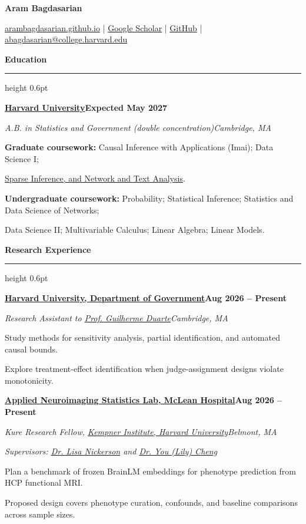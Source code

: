 \documentclass[11pt]{article}
\newcommand{\cvsection}[2][6\baselineskip]{%
  \Needspace{#1}%
  \vspace{5pt}%
  {\large\bfseries #2}\par
  \vspace{1pt}\hrule height 0.6pt \vspace{3pt}}
\newcommand{\cventry}[5][5\baselineskip]{%
  \Needspace{#1}%
  \vspace{2pt}%
  {\textbf{#2}\hfill\textbf{#3}\par}%
  {\textit{#4}\hfill\textit{#5}\par}%
}
\newcommand{\lnDuarte}{https://duarteguilherme.github.io/}
\newcommand{\lnKempner}{https://kempnerinstitute.harvard.edu/}
\newcommand{\lnNickerson}{https://mbb.harvard.edu/people/lisa-nickerson}
\newcommand{\lnGitHub}{https://github.com/arambagdasarian}
\newcommand{\lnSite}{https://arambagdasarian.github.io/}
\newcommand{\lnScholar}{https://scholar.google.com/citations?user=Gbhs4TcAAAAJ}
\newcommand{\lnCheng}{https://lilianyou.github.io/}
\newcommand{\lnANSR}{https://ansr-laboratory.github.io/opportunity/student-ra/}
\newcommand{\lnSparse}{https://my.harvard.edu/course/STAT236/2026-Fall/}
\newcommand{\lnHarvard}{https://www.harvard.edu/}
\newcommand{\lnGovernment}{https://www.gov.harvard.edu/}
\begin{document}
\thispagestyle{empty}
\raggedright

{\centering
  {\huge\bfseries Aram Bagdasarian}\par
  \vspace{3pt}
  {\href{\lnSite}{arambagdasarian.github.io} \quad|\quad
   \href{\lnScholar}{Google Scholar} \quad|\quad
   \href{\lnGitHub}{GitHub} \quad|\quad
   \href{mailto:abagdasarian@college.harvard.edu}{abagdasarian@college.harvard.edu}}\par
}
\cvsection{Education}
\cventry{\href{\lnHarvard}{Harvard University}}{Expected May 2027}
        {A.B. in Statistics and Government (double concentration)}{Cambridge, MA}
{\small\textbf{Graduate coursework:} Causal Inference with Applications (Imai); Data Science I;\par
\href{\lnSparse}{Sparse Inference, and Network and Text Analysis}.\par}
{\small\textbf{Undergraduate coursework:} Probability; Statistical Inference; Statistics and Data Science of Networks;\par
Data Science II; Multivariable Calculus; Linear Algebra; Linear Models.\par}

\cvsection{Research Experience}
\cventry{\href{\lnGovernment}{Harvard University, Department of Government}}{Aug 2026 -- Present}
        {Research Assistant to \href{\lnDuarte}{Prof. Guilherme Duarte}}{Cambridge, MA}
\begin{tight}
  \item Study methods for sensitivity analysis, partial identification, and automated causal bounds.
  \item Explore treatment-effect identification when judge-assignment designs violate monotonicity.
\end{tight}

\cventry{\href{\lnANSR}{Applied Neuroimaging Statistics Lab, McLean Hospital}}{Aug 2026 -- Present}
        {Kure Research Fellow, \href{\lnKempner}{Kempner Institute, Harvard University}}{Belmont, MA}
{\textit{Supervisors: \href{\lnNickerson}{Dr. Lisa Nickerson} and \href{\lnCheng}{Dr. You (Lily) Cheng}}\par}
\begin{tight}
  \item Plan a benchmark of frozen BrainLM embeddings for phenotype prediction from HCP functional MRI.
  \item Proposed design covers phenotype curation, confounds, and baseline comparisons across sample sizes.
\end{tight}
\end{document}
